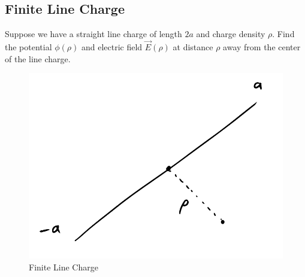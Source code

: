 \documentclass{article}
\begin{document}
\subsection{Finite Line Charge}
Suppose we have a straight line charge of length $2a$ and charge density $\rho$. Find the potential $\phi(\rho)$ and electric field $\vec{E}(\rho)$ at distance $\rho$ away from the center of the line charge.
\begin{figure}[h]
    \centering
    \includegraphics[width=0.8\linewidth]{images/finiteline.png}
    \caption{Finite Line Charge}
    \label{fig:finiteline}
\end{figure}
\end{document}
